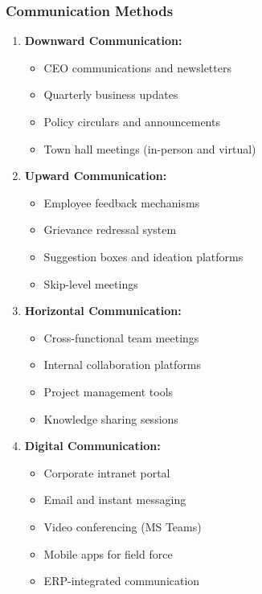 \documentclass[12pt,a4paper]{article}
\begin{document}
\subsubsection{Communication Methods}

\begin{enumerate}[leftmargin=*]
    \item \textbf{Downward Communication:}
    \begin{itemize}
        \item CEO communications and newsletters
        \item Quarterly business updates
        \item Policy circulars and announcements
        \item Town hall meetings (in-person and virtual)
    \end{itemize}
    
    \item \textbf{Upward Communication:}
    \begin{itemize}
        \item Employee feedback mechanisms
        \item Grievance redressal system
        \item Suggestion boxes and ideation platforms
        \item Skip-level meetings
    \end{itemize}
    
    \item \textbf{Horizontal Communication:}
    \begin{itemize}
        \item Cross-functional team meetings
        \item Internal collaboration platforms
        \item Project management tools
        \item Knowledge sharing sessions
    \end{itemize}
    
    \item \textbf{Digital Communication:}
    \begin{itemize}
        \item Corporate intranet portal
        \item Email and instant messaging
        \item Video conferencing (MS Teams)
        \item Mobile apps for field force
        \item ERP-integrated communication
    \end{itemize}
\end{enumerate}
\end{document}

